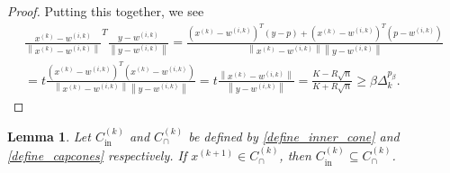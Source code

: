 \documentclass{article}
\newtheorem{lemma}[theorem]{Lemma}
\theoremstyle{case}
\numberwithin{theorem}{subsection}
\newcommand{\capcones}{{C^{(k)}_{\cap}}}
\newcommand{\dk}{\Delta_k}
\newcommand{\fcki}{{C^{(k)}_{\textrm{in}}}}
\newcommand{\wik}{{w^{(i, k)}}}
\newcommand{\xkpo}{{{x}^{(k+1)}}}
\newcommand{\xk}{x^{(k)}}
\begin{document}
\begin{proof}
Putting this together, we see
\begin{align*}
\frac{\xk - \wik}{\left\|\xk - \wik\right\|}^T\frac{y - \wik}{\left\|y - \wik\right\|} 
= \frac{\left(\xk - \wik\right) ^T\left(y - p\right) + \left(\xk - \wik\right)^T\left(p - \wik\right)}{\left\|\xk - \wik\right\|\left\|y - \wik\right\|} \\
= t\frac{\left(\xk - \wik\right)^T\left(\xk - \wik\right)}{\left\|\xk - \wik\right\|\left\|y - \wik\right\|}
= t \frac{\left\|\xk - \wik\right\|}{\left\|y - \wik\right\|}
= \frac {K - R\sqrt{n}}{K + R\sqrt{n}} \ge \beta \dk^{p_{\beta}}.
\end{align*}
\end{proof}

\begin{lemma}
\label{inner_cone_inside_each_cone}
Let $\fcki$ and $\capcones$ be defined by \cref{define_inner_cone} and \cref{define_capcones} respectively.
If 
$\xkpo \in \capcones$, then $\fcki \subseteq \capcones$.
\end{lemma}
\end{document}
